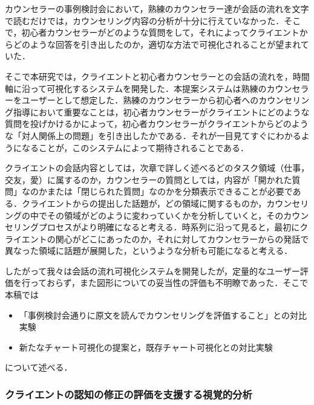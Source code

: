 \documentclass[shuuron]{kuee}
\begin{document}
カウンセラーの事例検討会において，熟練のカウンセラー達が会話の流れを文字で読むだけでは，カウンセリング内容の分析が十分に行えていなかった．そこで，初心者カウンセラーがどのような質問をして，それによってクライエントからどのような回答を引き出したのか，適切な方法で可視化されることが望まれていた．

そこで本研究では，クライエントと初心者カウンセラーとの会話の流れを，時間軸に沿って可視化するシステムを開発した．本提案システムは熟練のカウンセラーをユーザーとして想定した．熟練のカウンセラーから初心者へのカウンセリング指導において重要なことは，初心者カウンセラーがクライエントにどのような質問を投げかけるかによって，初心者カウンセラーがクライエントからどのような「対人関係上の問題」を引き出したかである．それが一目見てすぐにわかるようになることが，このシステムによって期待されることである．%



クライエントの会話内容としては，次章で詳しく述べるどのタスク領域（仕事，交友，愛）に属するのか，カウンセラーの質問としては，内容が「開かれた質問」なのかまたは「閉じられた質問」なのかを分類表示できることが必要である．クライエントからの提出した話題が，どの領域に関するものか，カウンセリングの中でその領域がどのように変わっていくかを分析していくと，そのカウンセリングプロセスがより明確になると考える．時系列に沿って見ると，最初にクライエントの関心がどこにあったのか，それに対してカウンセラーからの発話で異なった領域に話題が展開した，というような分析も可能になると考える．

したがって我々\cite{uetsuji}は会話の流れ可視化システムを開発したが，定量的なユーザー評価を行っておらず，また図形についての妥当性の評価も不明瞭であった．そこで本稿では
\begin{itemize}
\item 「事例検討会通りに原文を読んでカウンセリングを評価すること」との対比実験
\item 新たなチャート可視化の提案と，既存チャート可視化との対比実験
\end{itemize}
について述べる．

\subsubsection{クライエントの認知の修正の評価を支援する視覚的分析}

\end{document}
